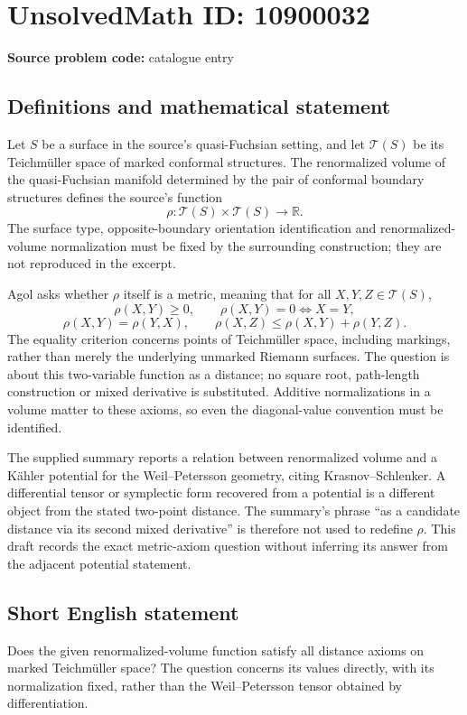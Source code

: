 \documentclass[11pt]{article}
\newcommand{\R}{\mathbb{R}}
\begin{document}
\section*{UnsolvedMath ID: 10900032}
\textbf{Source problem code:} catalogue entry
\subsection{Definitions and mathematical statement}
Let \(S\) be a surface in the source's quasi-Fuchsian setting, and let \(\mathcal T(S)\) be its Teichm\"uller space of marked conformal structures. The renormalized volume of the quasi-Fuchsian manifold determined by the pair of conformal boundary structures defines the source's function
\[\rho:\mathcal T(S)\times\mathcal T(S)\to\R.\]
The surface type, opposite-boundary orientation identification and renormalized-volume normalization must be fixed by the surrounding construction; they are not reproduced in the excerpt.

Agol asks whether \(\rho\) itself is a metric, meaning that for all \(X,Y,Z\in\mathcal T(S)\),
\[\rho(X,Y)\geq0,\qquad \rho(X,Y)=0\Longleftrightarrow X=Y,\]
\[\rho(X,Y)=\rho(Y,X),\qquad
\rho(X,Z)\leq\rho(X,Y)+\rho(Y,Z).\]
The equality criterion concerns points of Teichm\"uller space, including markings, rather than merely the underlying unmarked Riemann surfaces. The question is about this two-variable function as a distance; no square root, path-length construction or mixed derivative is substituted. Additive normalizations in a volume matter to these axioms, so even the diagonal-value convention must be identified.

The supplied summary reports a relation between renormalized volume and a K\"ahler potential for the Weil--Petersson geometry, citing Krasnov--Schlenker. A differential tensor or symplectic form recovered from a potential is a different object from the stated two-point distance. The summary's phrase ``as a candidate distance via its second mixed derivative'' is therefore not used to redefine \(\rho\). This draft records the exact metric-axiom question without inferring its answer from the adjacent potential statement.
\subsection{Short English statement}
Does the given renormalized-volume function satisfy all distance axioms on marked Teichm\"uller space? The question concerns its values directly, with its normalization fixed, rather than the Weil--Petersson tensor obtained by differentiation.
\end{document}

